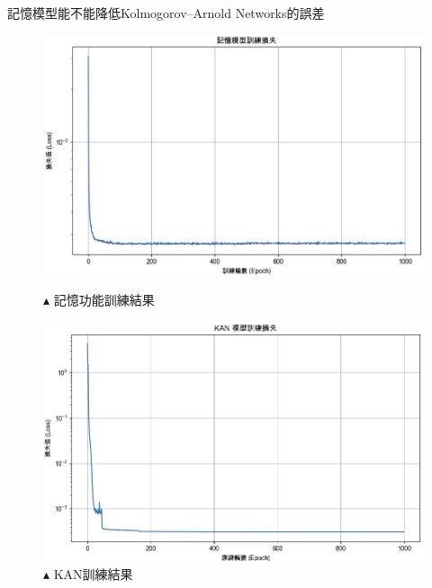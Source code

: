 \documentclass{beamer}
\begin{document}
\begin{frame}{記憶模型能不能降低Kolmogorov–Arnold Networks的誤差}
  \centering
  \begin{figure}
    \begin{minipage}{0.49\textwidth}
      \centering
      \includegraphics[width=\textwidth, keepaspectratio]{figures/記憶功能.jpg}
      \caption*{$\blacktriangle$ 記憶功能訓練結果}
    \end{minipage}%
    \hfill %
    \begin{minipage}{0.49\textwidth}
      \centering
      \includegraphics[width=\textwidth, keepaspectratio]{figures/kan_training_loss.jpeg}
      \caption*{$\blacktriangle$ KAN訓練結果}
    \end{minipage}
  \end{figure}
\end{frame}
\end{document}
